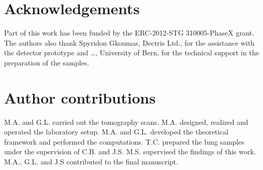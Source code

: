 \documentclass[preprint,12pt]{elsarticle}
\begin{document}
\section{Acknowledgements}
Part of this work has been funded by the ERC-2012-STG 310005-PhaseX grant.
The authors also thank Spyridon Gkoumas, Dectris Ltd., for the assistance
with the detector prototype and \dots, University of Bern, for the technical support in the
preparation of the samples.

\section{Author contributions}
M.A. and G.L. carried out the tomography scans. M.A. designed, realized and
operated the laboratory setup. M.A. and G.L. developed the theoretical
framework and performed the computations. T.C. prepared the lung samples
under the supervision of C.B. and J.S. M.S. supervised the findings of this
work. M.A., G.L. and J.S contributed to the final manuscript.

\clearpage


\end{document}
